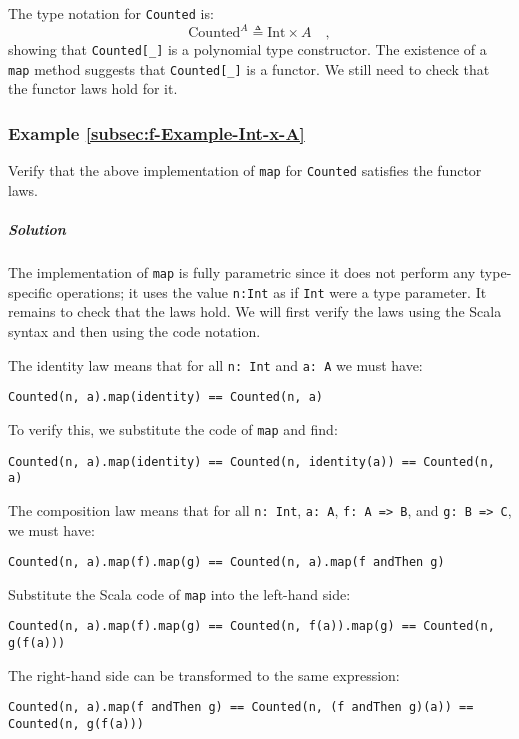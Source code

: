 The type notation for \lstinline!Counted! is:
\[
\text{Counted}^{A}\triangleq\text{Int}\times A\quad,
\]
showing that \lstinline!Counted[_]! is a polynomial type constructor.
The existence of a \lstinline!map! method suggests that \lstinline!Counted[_]!
is a functor. We still need to check that the functor laws hold for
it.

\subsubsection{Example \label{subsec:f-Example-Int-x-A}\ref{subsec:f-Example-Int-x-A}}

Verify that the above implementation of \lstinline!map! for \lstinline!Counted!
satisfies the functor laws. 

\subparagraph{Solution}

The implementation of \lstinline!map! is fully parametric since it
does not perform any type-specific operations; it uses the value \lstinline!n:Int!
as if \lstinline!Int! were a type parameter. It remains to check
that the laws hold. We will first verify the laws using the Scala
syntax and then using the code notation.

The identity law means that for all \lstinline!n: Int! and \lstinline!a: A!
we must have:
\begin{lstlisting}
Counted(n, a).map(identity) == Counted(n, a)
\end{lstlisting}
To verify this, we substitute the code of \lstinline!map! and find:
\begin{lstlisting}
Counted(n, a).map(identity) == Counted(n, identity(a)) == Counted(n, a)
\end{lstlisting}

The composition law means that for all \lstinline!n: Int!, \lstinline!a: A!,
\lstinline!f: A => B!, and \lstinline!g: B => C!, we must have:
\begin{lstlisting}
Counted(n, a).map(f).map(g) == Counted(n, a).map(f andThen g)
\end{lstlisting}
Substitute the Scala code of \lstinline!map! into the left-hand side:
\begin{lstlisting}
Counted(n, a).map(f).map(g) == Counted(n, f(a)).map(g) == Counted(n, g(f(a)))
\end{lstlisting}
The right-hand side can be transformed to the same expression:
\begin{lstlisting}
Counted(n, a).map(f andThen g) == Counted(n, (f andThen g)(a)) == Counted(n, g(f(a)))
\end{lstlisting}

